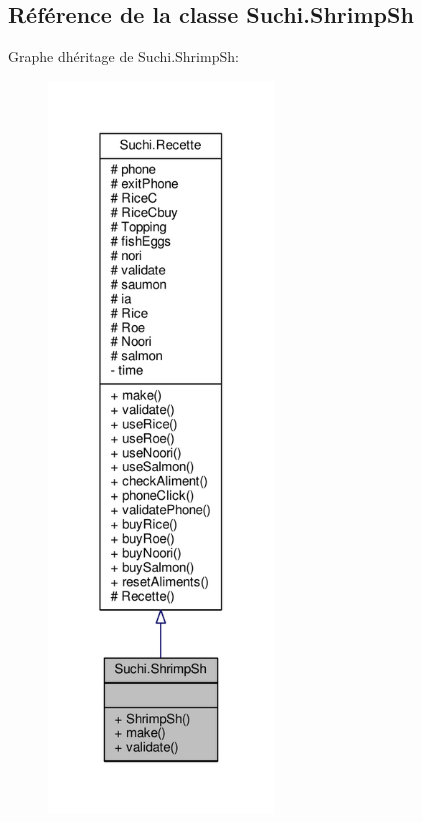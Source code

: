 \hypertarget{classSuchi_1_1ShrimpSh}{}\subsection{Référence de la classe Suchi.\+Shrimp\+Sh}
\label{classSuchi_1_1ShrimpSh}


Graphe d\textquotesingle{}héritage de Suchi.\+Shrimp\+Sh\+:\nopagebreak
\begin{figure}[H]
\begin{center}
\leavevmode
\includegraphics[height=550pt]{classSuchi_1_1ShrimpSh__inherit__graph}
\end{center}
\end{figure}



